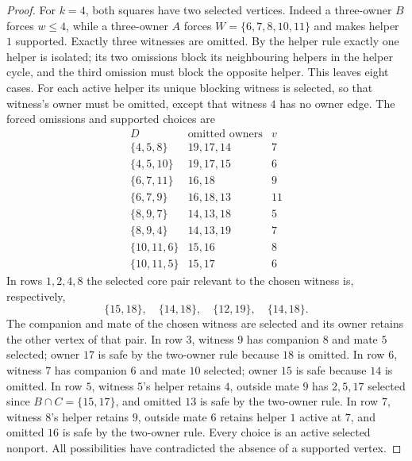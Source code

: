 \begin{proof}
For $k=4$, both squares have two selected vertices. Indeed a three-owner
$B$ forces $w\le4$, while a three-owner $A$ forces
$W=\{6,7,8,10,11\}$ and makes helper $1$ supported. Exactly three
witnesses are omitted. By the helper rule exactly one helper is isolated;
its two omissions block its neighbouring helpers in the helper cycle, and
the third omission must block the opposite helper. This leaves eight cases.
For each active helper its unique blocking witness is selected, so that
witness's owner must be omitted, except that witness $4$ has no owner edge.
The forced omissions and supported choices are
\[
\begin{array}{c|c|c}
D&\text{omitted owners}&v\\\hline
\{4,5,8\}&19,17,14&7\\
\{4,5,10\}&19,17,15&6\\
\{6,7,11\}&16,18&9\\
\{6,7,9\}&16,18,13&11\\
\{8,9,7\}&14,13,18&5\\
\{8,9,4\}&14,13,19&7\\
\{10,11,6\}&15,16&8\\
\{10,11,5\}&15,17&6
\end{array}
\]
In rows $1,2,4,8$ the selected core pair relevant to the chosen witness is,
respectively,
\[
 \{15,18\},\quad\{14,18\},\quad\{12,19\},\quad\{14,18\}.
\]
The companion and mate of the chosen witness are selected and its owner
retains the other vertex of that pair. In row $3$, witness $9$ has companion
$8$ and mate $5$ selected; owner $17$ is safe by the two-owner rule because
$18$ is omitted. In row $6$, witness $7$ has companion $6$ and mate $10$
selected; owner $15$ is safe because $14$ is omitted.
In row $5$, witness $5$'s helper retains $4$, outside mate $9$ has $2,5,17$
selected since $B\cap C=\{15,17\}$, and omitted $13$ is safe by the
two-owner rule. In row $7$, witness $8$'s helper retains $9$, outside mate
$6$ retains helper $1$ active at $7$, and omitted $16$ is safe by the
two-owner rule. Every choice is an active selected nonport.
All possibilities have contradicted the absence of a supported vertex.
\end{proof}

